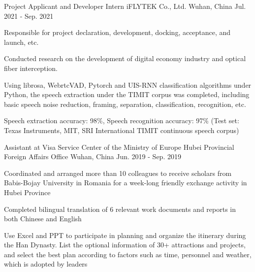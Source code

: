 

\begin{cventries}

  \cventry
    {Project Applicant and Developer Intern} %
    {iFLYTEK Co., Ltd.} %
    {Wuhan, China} %
    {Jul. 2021 - Sep. 2021} %
    {
      \begin{cvitems} %
        \item {Responsible for project declaration, development, docking, acceptance, and launch, etc.}
        \item {Conducted research on the development of digital economy industry and optical fiber interception.}
        \item {Using librosa, WebrtcVAD, Pytorch and UIS-RNN classification algorithms under Python, the speech extraction under the TIMIT corpus was completed, including basic speech noise reduction, framing, separation, classification, recognition, etc.}
        \item {Speech extraction accuracy: 98\%, Speech recognition accuracy: 97\% (Test set: Texas Instruments, MIT, SRI International TIMIT continuous speech corpus)}
      \end{cvitems}
    }

  \cventry
    {Assistant at Visa Service Center of the Ministry of Europe} %
    {Hubei Provincial Foreign Affairs Office} %
    {Wuhan, China} %
    {Jun. 2019 - Sep. 2019} %
    {
      \begin{cvitems} %
        \item {Coordinated and arranged more than 10 colleagues to receive scholars from Babis-Bojay University in Romania for a week-long friendly exchange activity in Hubei Province}
        \item {Completed bilingual translation of 6 relevant work documents and reports in both Chinese and English}
        \item {Use Excel and PPT to participate in planning and organize the itinerary during the Han Dynasty. List the optional information of 30+ attractions and projects, and select the best plan according to factors such as time, personnel and weather, which is adopted by leaders}
      \end{cvitems}
    }

\end{cventries}
